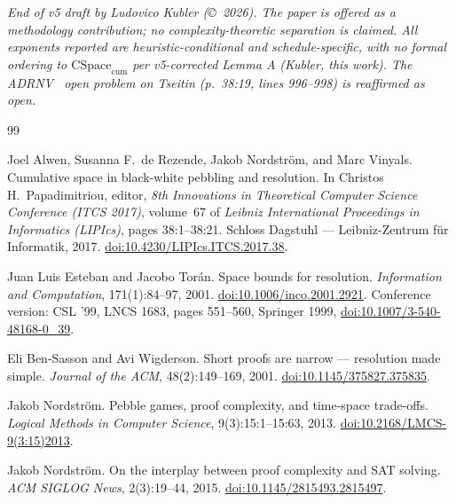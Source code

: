 \documentclass[11pt,a4paper]{article}
\theoremstyle{remark}
\begin{document}
{\medskip

\noindent\emph{End of v5 draft by Ludovico Kubler (\copyright\ 2026).
The paper is offered as a methodology contribution; no
complexity-theoretic separation is claimed. All exponents reported
are heuristic-conditional and schedule-specific, with no formal ordering
to $\mathrm{CSpace}_{\mathrm{cum}}$ per v5-corrected Lemma A
(Kubler, this work). The ADRNV~\cite{ADRNV2017} open problem on
Tseitin (p.~38:19, lines 996--998) is reaffirmed as open.}

\begin{thebibliography}{99}

Joel Alwen, Susanna F.\ de Rezende, Jakob Nordstr\"om, and Marc Vinyals.
\newblock Cumulative space in black-white pebbling and resolution.
\newblock In Christos H.\ Papadimitriou, editor, \emph{8th Innovations in
Theoretical Computer Science Conference (ITCS 2017)}, volume~67 of
\emph{Leibniz International Proceedings in Informatics (LIPIcs)}, pages
38:1--38:21. Schloss Dagstuhl --- Leibniz-Zentrum f\"ur Informatik, 2017.
\newblock \href{https://doi.org/10.4230/LIPIcs.ITCS.2017.38}{doi:10.4230/LIPIcs.ITCS.2017.38}.

Juan Luis Esteban and Jacobo Tor\'an.
\newblock Space bounds for resolution.
\newblock \emph{Information and Computation}, 171(1):84--97, 2001.
\newblock \href{https://doi.org/10.1006/inco.2001.2921}{doi:10.1006/inco.2001.2921}.
\newblock Conference version: CSL '99, LNCS 1683, pages 551--560, Springer 1999,
\href{https://doi.org/10.1007/3-540-48168-0_39}{doi:10.1007/3-540-48168-0\_39}.

Eli Ben-Sasson and Avi Wigderson.
\newblock Short proofs are narrow --- resolution made simple.
\newblock \emph{Journal of the ACM}, 48(2):149--169, 2001.
\newblock \href{https://doi.org/10.1145/375827.375835}{doi:10.1145/375827.375835}.

Jakob Nordstr\"om.
\newblock Pebble games, proof complexity, and time-space trade-offs.
\newblock \emph{Logical Methods in Computer Science}, 9(3):15:1--15:63, 2013.
\newblock \href{https://doi.org/10.2168/LMCS-9(3:15)2013}{doi:10.2168/LMCS-9(3:15)2013}.

Jakob Nordstr\"om.
\newblock On the interplay between proof complexity and SAT solving.
\newblock \emph{ACM SIGLOG News}, 2(3):19--44, 2015.
\newblock \href{https://doi.org/10.1145/2815493.2815497}{doi:10.1145/2815493.2815497}.


\end{thebibliography}}
\end{document}
